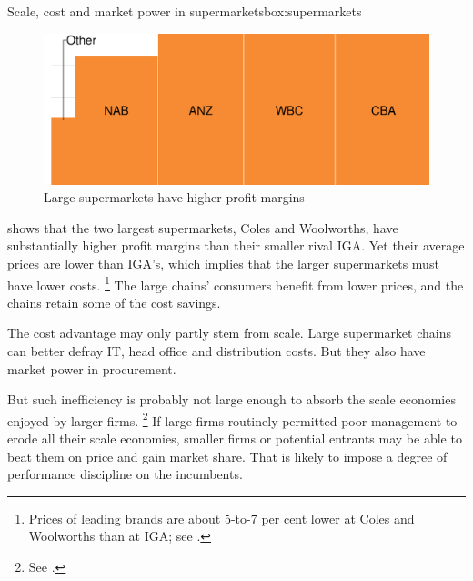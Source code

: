 \begin{smallbox}[H]{Scale, cost and market power in supermarkets}{box:supermarkets}

\begin{figure}[H]\vspace{-5pt}
    \caption{Large supermarkets have higher profit margins\label{fig:profit_margins_supermarket}}
    \includegraphics[page=2]{atlas/ChartsL2} 
\end{figure}\vspace{-15pt}

 shows that the two largest supermarkets, Coles and Woolworths, have substantially higher profit margins than their smaller rival IGA\@.
Yet their average prices are lower than IGA's, which implies that the larger supermarkets must have lower costs.%
    \footnote{Prices of leading brands are about 5-to-7 per cent lower at Coles and Woolworths than at IGA\@;
    see \textcite{Choice-supermarket-want-to-spend-less}.}
The large chains' consumers benefit from lower prices, and the chains retain some of the cost savings.

The cost advantage may only partly stem from scale. Large supermarket chains can better defray IT, head office and distribution costs. But they also have market power in procurement.
\end{smallbox}

But such inefficiency is probably not large enough to absorb the scale economies enjoyed by larger firms.%
    \footnote{See \textcites{barros2008analysing}{yang2009small}{shamsuddin2012does}.}
If large firms routinely permitted poor management to erode all their scale economies, smaller firms or potential entrants may be able to beat them on price and gain market share. That is likely to impose a degree of performance discipline on the incumbents.

